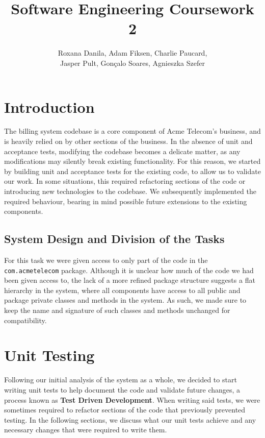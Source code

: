 \documentclass[a4paper]{article}
\begin{document}
\title{Software Engineering Coursework 2}
\author{Roxana Danila, Adam Fiksen, Charlie Paucard,\\Jasper Pult, Gon\c{c}alo Soares, Agnieszka Szefer}

\maketitle

\section{Introduction}
The billing system codebase is a core component of Acme Telecom's business, and is heavily relied on by other sections of the business. In the absence of unit and acceptance tests, modifying the codebase becomes a delicate matter, as any modifications may silently break existing functionality. For this reason, we started by building unit and acceptance tests for the existing code, to allow us to validate our work. In some situations, this required refactoring sections of the code or introducing new technologies to the codebase. We subsequently implemented the required behaviour, bearing in mind possible future extensions to the existing components.

\subsection{System Design and Division of the Tasks}
For this task we were given access to only part of the code in the \verb+com.acmetelecom+ package. Although it is unclear how much of the code we had been given access to, the lack of a more refined package structure suggests a flat hierarchy in the system, where all components have access to all public and package private classes and methods in the system. As such, we made sure to keep the name and signature of such classes and methods unchanged for compatibility.

\section{Unit Testing}
Following our initial analysis of the system as a whole, we decided to start writing unit tests to help document the code and validate future changes, a process known as {\bf Test Driven Development}. When writing said tests, we were sometimes required to refactor sections of the code that previously prevented testing. In the following sections, we discuss what our unit tests achieve and any necessary changes that were required to write them.
\end{document}
